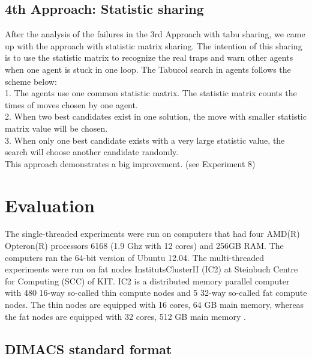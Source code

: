 \documentclass[12pt,a4paper,twoside]{scrartcl}
\numberwithin{equation}{section}
\begin{document}
\subsection{4th Approach: Statistic sharing}
\label{4th Approach: Statistic sharing}
After the analysis of the failures in the 3rd Approach with tabu sharing, we came up with the approach with statistic matrix sharing. The intention of this sharing is to use the statistic matrix to recognize the real traps and warn other agents when one agent is stuck in one loop.
The Tabucol search in agents follows the scheme below:\\
1. The agents use one common statistic matrix. The statistic matrix counts the times of moves chosen by one agent.\\
2. When two best candidates exist in one solution, the move with smaller statistic matrix value will be chosen.\\
3. When only one best candidate exists with a very large statistic value, the search will choose another candidate randomly.\\
This approach demonstrates a big improvement. (see Experiment 8)
\clearpage
\section{Evaluation}
The single-threaded experiments were run on computers that had four AMD(R) Opteron(R) processors 6168 (1.9 Ghz with 12 cores) and 256GB RAM. The computers ran the 64-bit version of Ubuntu 12.04. The multi-threaded experiments were run on fat nodes InstitutsClusterII (IC2) at Steinbuch Centre for Computing (SCC) of KIT. IC2 is a distributed memory parallel computer with 480 16-way so-called thin compute nodes and 5 32-way so-called fat compute nodes. The thin nodes are equipped with 16 cores, 64 GB main memory, whereas the fat nodes are equipped with 32 cores, 512 GB main memory \cite{ic2}.
\subsection{DIMACS standard format}
\end{document}

